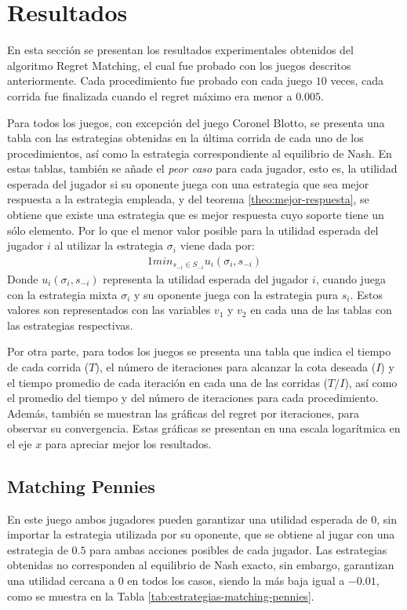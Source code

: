 \section{Resultados}
En esta sección se presentan los resultados experimentales obtenidos del algoritmo Regret Matching, el cual fue probado con los juegos descritos anteriormente. Cada procedimiento fue probado con cada juego $10$ veces, cada corrida fue finalizada cuando el regret máximo era menor a $0.005$.

Para todos los juegos, con excepción del juego Coronel Blotto, se presenta una tabla con las estrategias obtenidas en la última corrida de cada uno de los procedimientos, así como la estrategia correspondiente al equilibrio de Nash. En estas tablas, también se añade el \textit{peor caso} para cada jugador, esto es, la utilidad esperada del jugador si su oponente juega con una estrategia que sea mejor respuesta a la estrategia empleada, y del teorema \ref{theo:mejor-respuesta}, se obtiene que existe una estrategia que es mejor respuesta cuyo soporte tiene un sólo elemento. Por lo que el menor valor posible para la utilidad esperada del jugador $i$ al utilizar la estrategia $\sigma_i$ viene dada por:
\begin{alignat}{1}
min_{s_{-i} \in S_{-i}} u_i(\sigma_i, s_{-i})
\end{alignat}
Donde $u_i(\sigma_i, s_{-i})$ representa la utilidad esperada del jugador $i$, cuando juega con la estrategia mixta $\sigma_i$ y su oponente juega con la estrategia pura $s_i$. Estos valores son representados con las variables $v_1$ y $v_2$ en cada una de las tablas con las estrategias respectivas.

Por otra parte, para todos los juegos se presenta una tabla que indica el tiempo de cada corrida ($T$), el número de iteraciones para alcanzar la cota deseada ($I$) y el tiempo promedio de cada iteración en cada una de las corridas ($T/I$), así como el promedio del tiempo y del número de iteraciones para cada procedimiento. Además, también se muestran las gráficas del regret por iteraciones, para observar su convergencia. Estas gráficas se presentan en una escala logarítmica en el eje $x$ para apreciar mejor los resultados.

\subsection{Matching Pennies}
En este juego ambos jugadores pueden garantizar una utilidad esperada de $0$, sin importar la estrategia utilizada por su oponente, que se obtiene al jugar con una estrategia de $0.5$ para ambas acciones posibles de cada jugador. Las estrategias obtenidas no corresponden al equilibrio de Nash exacto, sin embargo, garantizan una utilidad cercana a $0$ en todos los casos, siendo la más baja igual a $-0.01$, como se muestra en la Tabla \ref{tab:estrategias-matching-pennies}.

